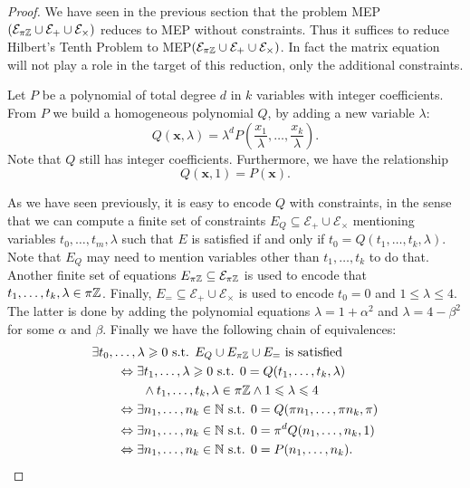 \begin{proof}
  We have seen in the previous section that the problem
  MEP$(\mathcal{E}_{\pi\mathbb{Z}}\cup\mathcal{E}_{+}\cup\mathcal{E}_{\times})$
  reduces to MEP without constraints.  Thus it suffices to reduce
  Hilbert's Tenth Problem to
  MEP$(\mathcal{E}_{\pi\mathbb{Z}}\cup\mathcal{E}_{+}\cup\mathcal{E}_{\times})$.
  In fact the matrix equation will not play a role in the
  target of this reduction, only the additional constraints.

  Let $P$ be a polynomial of total degree $d$ in $k$ variables with
  integer coefficients. From $P$ we build a homogeneous polynomial $Q$, by
  adding a new variable $\lambda$:
  \[Q(\mathbf{x},\lambda)=\lambda^{d}P\left(\frac{x_1}{\lambda},\ldots,
    \frac{x_k}{\lambda}\right).\]
  Note that $Q$ still has integer coefficients. Furthermore, we have the relationship
\[Q(\mathbf{x},1)=P(\mathbf{x}).\]

As we have seen previously, it is easy to encode $Q$ with constraints,
in the sense that we can compute a finite set of constraints
$E_Q \subseteq \mathcal{E}_{+}\cup\mathcal{E}_{\times}$ mentioning variables
$t_0,\ldots,t_m,\lambda$
such that $E$ is
satisfied if and only if $t_0=Q(t_1,\ldots,t_k,\lambda)$. Note that
$E_Q$ may need to mention variables other
than $t_1,\ldots,t_k$ to do that.  Another
finite set of equations
$E_{\pi\mathbb{Z}}\subseteq\mathcal{E}_{\pi\mathbb{Z}}$ is used to
encode that $t_1,\ldots,t_k,\lambda\in\pi\mathbb{Z}$. Finally,
$E_{=}\subseteq\mathcal{E}_{+}\cup\mathcal{E}_{\times}$ is used to
encode $t_{0}=0$ and $1\leqslant \lambda\leqslant4$.  The
latter is done by adding the polynomial equations $\lambda=1+\alpha^2$ and
$\lambda=4-\beta^2$ for some $\alpha$ and $\beta$. Finally we have the
following chain of equivalences:
\begin{align*}
&\exists t_0,\ldots,\lambda\geqslant0\text{ s.t. }E_Q\cup E_{\pi\mathbb{Z}}\cup E_{=}\text{ is satisfied }\\
&\qquad\Leftrightarrow\exists t_1,\ldots,\lambda\geqslant0\text{ s.t. } 0=Q(t_1,\ldots,t_k,\lambda)\\
    &\qquad\qquad\wedge t_1,\ldots,t_k,\lambda\in\pi\mathbb{Z}\wedge 1\leqslant\lambda\leqslant4\\
&\qquad\Leftrightarrow\exists n_1,\ldots,n_k\in\mathbb{N}\text{ s.t. } 0=Q(\pi n_1,\ldots,\pi n_k,\pi)\\
&\qquad\Leftrightarrow\exists n_1,\ldots,n_k\in\mathbb{N}\text{ s.t. } 0=\pi^{d} Q(n_1,\ldots,n_k,1)\\
&\qquad\Leftrightarrow\exists n_1,\ldots,n_k\in\mathbb{N}\text{ s.t. } 0=P(n_1,\ldots,n_k).\\
\end{align*}
\end{proof}
